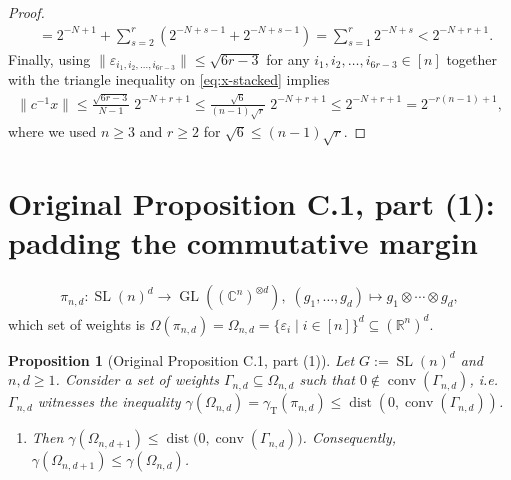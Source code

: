 \documentclass[10pt,a4paper]{article}
\newtheorem{prp}[thm]{Proposition}\crefname{prp}{Proposition}{Propositions}
\numberwithin{equation}{section}
\DeclareMathOperator{\SL}{SL}
\DeclareMathOperator{\GL}{GL}
\DeclareMathOperator{\T}{T}
\DeclareMathOperator{\conv}{conv}
\DeclareMathOperator{\dist}{dist}
\newcommand{\CC}{\mathbb C}
\newcommand{\RR}{\mathbb R}
\newcommand{\eps}{\varepsilon}
\begin{document}
\begin{proof}
\begin{align*}
	&= 2^{-N+1} + \sum_{s=2}^r \left( 2^{-N+s-1} + 2^{-N+s-1} \right)
	= \sum_{s=1}^r 2^{-N+s} < 2^{-N + r + 1}.
	\end{align*}
Finally, using $\| \eps_{i_1, i_2, \ldots, i_{6 r  -3}} \| \leq \sqrt{6 r - 3}$ for any $i_1, i_2, \ldots,i_{6r - 3} \in [n]$ together with the triangle inequality on \cref{eq:x-stacked} implies
	\begin{align*}
	\| c^{-1} x\| \leq \frac{\sqrt{6 r - 3}}{N - 1} \; 2^{-N + r + 1}
	\leq \frac{\sqrt{6}}{(n-1)\sqrt{r}} \; 2^{-N + r + 1} \leq 2^{-N + r + 1} = 2^{- r (n-1) + 1},
	\end{align*}
where we used $n \geq 3$ and $r \geq 2$ for $\sqrt{6} \leq (n-1) \sqrt{r}$.
\end{proof}


\appendix\setcounter{section}{2}\section{Original Proposition C.1, part (1): padding the commutative margin}\label{subsec:extension}	\begin{align*}
	\pi_{n,d} \colon \SL(n)^d \to \GL\left( (\CC^n)^{\otimes d} \right), \; (g_1, \ldots, g_d) \mapsto g_1 \otimes \cdots \otimes g_d,
	\end{align*}
which set of weights is $\Omega(\pi_{n,d}) = \Omega_{n,d} = \lbrace \eps_{i} \mid i \in [n] \rbrace^d \subseteq (\RR^n)^d$.

\begin{prp}[Original Proposition C.1, part (1)]\label{prp:dTensorsPadding}
Let $G:= \SL(n)^d$ and $n,d \geq 1$. Consider a set of weights $\Gamma_{n,d} \subseteq \Omega_{n,d}$ such that $0 \notin \conv(\Gamma_{n,d})$, i.e. $\Gamma_{n,d}$ witnesses the inequality $\gamma(\Omega_{n,d}) = \gamma_{\T}(\pi_{n,d}) \leq \dist (0, \conv(\Gamma_{n,d}))$.
	\begin{enumerate}
	\item  Then $\gamma(\Omega_{n,d+1}) \leq \dist \big(0, \conv(\Gamma_{n,d}) \big)$. Consequently, $\gamma(\Omega_{n,d+1}) \leq \gamma(\Omega_{n,d})$.

	\end{enumerate}

\end{prp}
\end{document}
